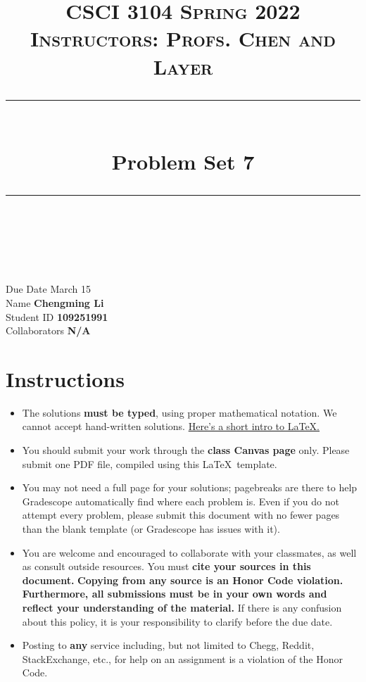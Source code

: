 \documentclass[11pt]{article}
\title{
\normalfont \normalsize 
\textsc{CSCI 3104 Spring 2022 \\ 
Instructors: Profs. Chen and Layer} \\
[10pt] 
\rule{\linewidth}{0.5pt} \\[6pt] 
\huge Problem Set 7\\
\rule{\linewidth}{2pt}  \\[10pt]
}
\date{}
\theoremstyle{definition}
\theoremstyle{definition}
\theoremstyle{definition}
\begin{document}
\maketitle


\noindent
Due Date \dotfill March 15 \\
Name \dotfill \textbf{Chengming Li} \\
Student ID \dotfill \textbf{109251991} \\
Collaborators \dotfill \textbf{N/A}

\tableofcontents

\section{Instructions}
{\small
 \begin{itemize}
	\item The solutions \textbf{must be typed}, using proper mathematical notation. We cannot accept hand-written solutions. \href{http://ece.uprm.edu/~caceros/latex/introduction.pdf}{Here's a short intro to \LaTeX.}
	\item You should submit your work through the \textbf{class Canvas page} only. Please submit one PDF file, compiled using this \LaTeX \ template.
	\item You may not need a full page for your solutions; pagebreaks are there to help Gradescope automatically find where each problem is. Even if you do not attempt every problem, please submit this document with no fewer pages than the blank template (or Gradescope has issues with it).

	\item You are welcome and encouraged to collaborate with your classmates, as well as consult outside resources. You must \textbf{cite your sources in this document.} \textbf{Copying from any source is an Honor Code violation. Furthermore, all submissions must be in your own words and reflect your understanding of the material.} If there is any confusion about this policy, it is your responsibility to clarify before the due date. 

	\item Posting to \textbf{any} service including, but not limited to Chegg, Reddit, StackExchange, etc., for help on an assignment is a violation of the Honor Code.

\end{itemize}}
\end{document}
